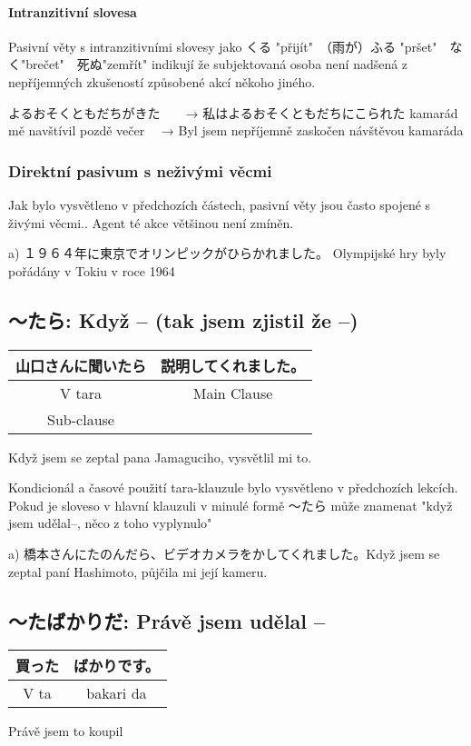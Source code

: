 \paragraph{Intranzitivní slovesa}
Pasivní věty s intranzitivními slovesy jako くる "přijít"　（雨が）ふる "pršet"　なく"brečet"　死ぬ"zemřít" indikují že subjektovaná osoba není nadšená z nepříjemných zkušeností způsobené akcí někoho jiného.

よるおそくともだちがきた　　→     私はよるおそくともだちにこられた
kamarád mě navštívil pozdě večer      　→      Byl jsem nepříjemně zaskočen návštěvou kamaráda

\subsubsection{Direktní pasivum s neživými věcmi}
Jak bylo vysvětleno v předchozích částech, pasivní věty jsou často spojené s živými věcmi.. Agent té akce většinou není zmíněn.

a) １９６４年に東京でオリンピックがひらかれました。 Olympijské hry byly pořádány v Tokiu v roce 1964

\subsection{〜たら: Když -- (tak jsem zjistil že --)}
\begin{center}
\begin{tabular}{||c||c||}
\hline
山口さんに聞いたら&説明してくれました。\\
\hline
V tara&Main Clause\\
\hline
Sub-clause&\\
\hline
\end{tabular}
\end{center}
Když jsem se zeptal pana Jamaguciho, vysvětlil mi to.

Kondicionál a časové použití tara-klauzule bylo vysvětleno v předchozích lekcích. Pokud je sloveso v hlavní klauzuli v minulé formě 〜たら může znamenat  "když jsem udělal--, něco z toho vyplynulo" 

a) 橋本さんにたのんだら、ビデオカメラをかしてくれました。Když jsem se zeptal paní Hashimoto, půjčila mi její kameru.

\subsection{〜たばかりだ: Právě jsem udělal --}
\begin{center}
\begin{tabular}{||c|c||}
\hline
買った&ばかりです。\\
\hline
V ta&bakari da\\
\hline
\end{tabular}
\end{center}
Právě jsem to koupil


